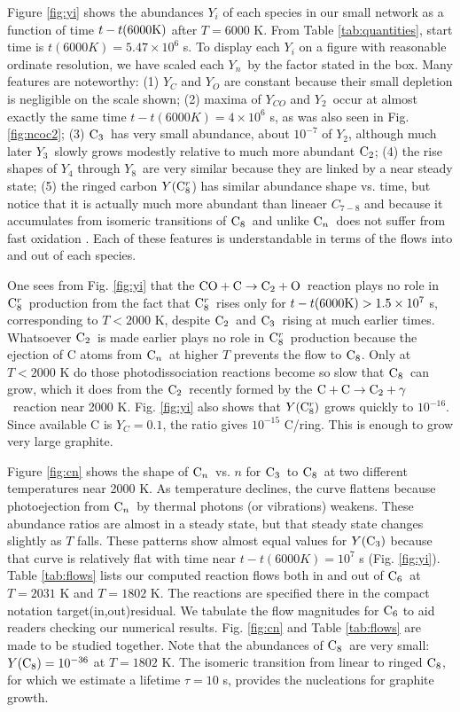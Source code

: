 \documentclass[manuscript]{aastex}
\newcommand{\ctwo}{{\rm C}_2}
\newcommand{\cthree}{{\rm C}_3}
\newcommand{\csix}{{\rm C}_6}
\newcommand{\ceight}{{\rm C}_8}
\newcommand{\ceightr}{{\rm C}_8^r}
\newcommand{\cenn}{{\rm C}_n}
\newcommand{\twoctoctwo}{${\rm C} + {\rm C} \to \ctwo + \gamma$}
\newcommand{\coctoctwo}{${\rm CO} + {\rm C} \to \ctwo + {\rm O}$}
\begin{document}
Figure \ref{fig:yi}
shows the abundances $Y_i$ of each species in our small network as a
function of time $t-t(6000 {\rm K})$ after $T=6000$ K.
From Table \ref{tab:quantities},
start time is $t(6000K) =5.47 \times 10^6$ s.
To display each $Y_i$ on a figure with
reasonable ordinate resolution, we have scaled each $Y_n$\ by the factor
stated in the box. Many features are noteworthy: (1) $Y_C$ and $Y_O$ 
are constant
because their small depletion is negligible on the scale shown;
(2) maxima of $Y_{CO}$ and $Y_2$\ occur at almost exactly the same time
$t-t(6000K)= 4 \times 10^6$ s, as was also seen in Fig. \ref{fig:ncoc2};
(3) $\cthree$\ has very small abundance, about $10^{-7}$ of $Y_2$, 
although much later $Y_3$\ slowly grows modestly
relative to much more abundant $\ctwo$; (4) the rise shapes of $Y_4$
through $Y_8$\ are very similar because they are linked by a near steady
state; (5) the ringed carbon $Y(\ceightr$) has similar abundance shape vs. time,
but notice that it is actually much more abundant than lineaer $C_{7-8}$ and
because it accumulates from isomeric transitions of $\ceight$\
and unlike $\cenn$\ does not
suffer from fast oxidation \citep{1999Sci...283.1290C}. Each of these
features is understandable in terms of the flows into and out of each species. 

One sees from Fig. \ref{fig:yi} that the \coctoctwo\ reaction plays no
role in $\ceightr$\ production from the fact that $\ceightr$\ rises only for
$t - t(6000 {\rm K}) > 1.5 \times 10^7$ s, corresponding to $T < 2000$ K,
despite $\ctwo$\ and $\cthree$\ rising at much earlier times.
Whatsoever $\ctwo$\ is made earlier plays no role in $\ceightr$\ production
because the ejection of C atoms from $\cenn$\ at higher $T$ prevents the
flow to $\ceight$.  Only at $T < 2000$ K do those photodissociation reactions
become so slow that $\ceight$\ can grow, which it does from the $\ctwo$\
recently
formed by the \twoctoctwo\ reaction near 2000 K.  Fig. \ref{fig:yi} also shows
that $Y(\ceightr)$
grows quickly to $10^{-16}$.  Since available C is $Y_C = 0.1$,
the ratio gives $10^{-15}$ C/ring.  This is enough to grow very large
graphite.

Figure \ref{fig:cn} shows the shape of $\cenn$\ vs. $n$ for $\cthree$\ to
$\ceight$\ at two different temperatures near 2000 K. As temperature declines,
the curve flattens because photoejection from $\cenn$\ by thermal photons
(or vibrations) weakens. These abundance ratios are almost in a steady state,
but that steady state changes slightly as $T$ falls. These patterns show
almost equal values for $Y(\cthree)$ because that curve is relatively flat
with time near $t-t(6000K) = 10^7$ s (Fig. \ref{fig:yi}).
Table \ref{tab:flows} lists our computed reaction flows both in and out of
$\csix$\ at $T = 2031$ K and $T = 1802$ K.
The reactions are specified there in the
compact notation target(in,out)residual. 
We tabulate the flow magnitudes for $\csix$ to aid readers checking our
numerical results. Fig. \ref{fig:cn} and
Table \ref{tab:flows} are made to be studied together.
Note that the abundances of $\ceight$\ are very small:
$Y(\ceight)= 10^{-36}$ at $T = 1802$ K.
The isomeric transition from linear to
ringed $\ceight$, for which we estimate a lifetime $\tau = 10$ s,
provides the nucleations for graphite growth.
\end{document}
